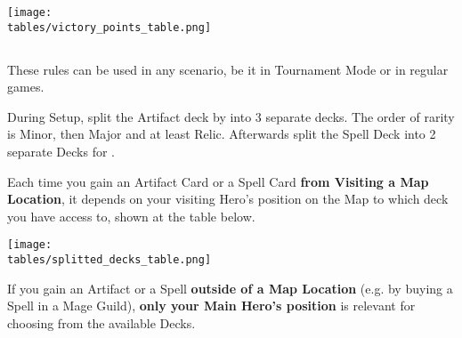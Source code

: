 \begin{multicols*}{2}
\texttt{[image: \\tables/victory\_points\_table.png]}


\subsection*{}

These rules can be used in any scenario, be it in Tournament Mode or in regular games.

During Setup, split the Artifact deck by  into 3 separate decks.
The order of rarity is Minor, then Major and at least Relic.
Afterwards split the Spell Deck into 2 separate Decks for .

Each time you gain an Artifact Card or a Spell Card \textbf{from Visiting a Map Location}, it depends on your visiting Hero's position on the Map to which deck you have access to, shown at the table below.

\texttt{[image: \\tables/splitted\_decks\_table.png]}

If you gain an Artifact or a Spell \textbf{outside of a Map Location} (e.g. by buying a Spell in a Mage Guild), \textbf{only your Main Hero's position} is relevant for choosing from the available Decks.

\end{multicols*}
